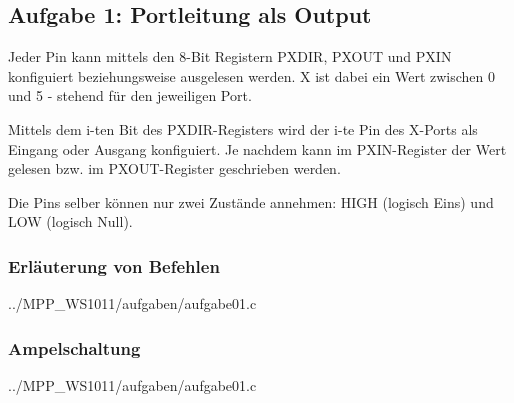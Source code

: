\subsection*{Aufgabe 1: Portleitung als Output}

Jeder Pin kann mittels den 8-Bit Registern PXDIR, PXOUT und PXIN konfiguiert beziehungsweise ausgelesen werden.
X ist dabei ein Wert zwischen 0 und 5 - stehend für den jeweiligen Port.

Mittels dem i-ten Bit des PXDIR-Registers wird der i-te Pin des X-Ports als Eingang oder Ausgang konfiguiert.
Je nachdem kann im PXIN-Register der Wert gelesen bzw. im PXOUT-Register geschrieben werden.

Die Pins selber können nur zwei Zustände annehmen: HIGH (logisch Eins) und LOW (logisch Null).
\subsubsection*{Erläuterung von Befehlen}

{../MPP_WS1011/aufgaben/aufgabe01.c}

\subsubsection*{Ampelschaltung}


{../MPP_WS1011/aufgaben/aufgabe01.c}
